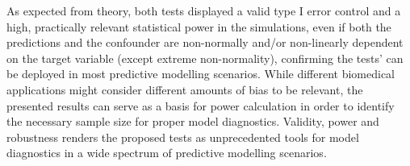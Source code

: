 \documentclass{article}
\begin{document}
As expected from theory, both tests displayed a valid type I error control and a high, practically relevant statistical power in the simulations, even if both the predictions and the confounder are non-normally and/or non-linearly dependent on the target variable (except extreme non-normality), confirming the tests' can be deployed in most predictive modelling scenarios. While different biomedical applications might consider different amounts of bias to be relevant, the presented results can serve as a basis for power calculation in order to identify the necessary sample size for proper model diagnostics.
Validity, power and robustness renders the proposed tests as unprecedented tools for model diagnostics in a wide spectrum of predictive modelling scenarios.


\end{document}
